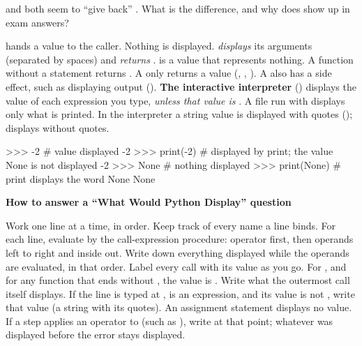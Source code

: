 \documentclass[10pt]{scrartcl}
\newenvironment{howto}[1]{\begin{mdframed}[style=howtostyle]{\color{NavyBlue}\textbf{#1}}\par\vspace{2pt}}{\end{mdframed}}
\begin{document}
\begin{qbox}
   and  both seem to ``give back'' . What is the difference, and why does  show up in exam answers?
\end{qbox}
\begin{itemize}
  \ii {} hands a value to the caller. Nothing is displayed.
  \ii {} \emph{displays} its arguments (separated by spaces) and \emph{returns} .
  \ii {} is a value that represents nothing. A function without a  statement returns .
  \ii A  only returns a value (, , ). A  also has a side effect, such as displaying output ().
  \ii \textbf{The interactive interpreter} (\cd{>{}>{}>}) displays the value of each expression you type, \emph{unless that value is }. A file run with  displays only what is printed.
  \ii In the interpreter a string value is displayed with quotes ();  displays  without quotes.
\end{itemize}
\begin{py}
>>> -2            # value displayed
-2
>>> print(-2)     # displayed by print; the value None is not displayed
-2
>>> None          # nothing displayed
>>> print(None)   # print displays the word None
None
\end{py}

\begin{howto}{How to answer a ``What Would Python Display'' question}
\begin{steps}
  \ii Work one line at a time, in order. Keep track of every name a line binds.
  \ii For each line, evaluate by the call-expression procedure: operator first, then operands left to right and inside out. Write down everything displayed while the operands are evaluated, in that order.
  \ii Label every call with its value as you go. For , and for any function that ends without , the value is .
  \ii Write what the outermost call itself displays.
  \ii If the line is typed at \cd{>{}>{}>}, is an expression, and its value is not , write that value (a string with its quotes). An assignment statement displays no value.
  \ii If a step applies an operator to  (such as ), write  at that point; whatever was displayed before the error stays displayed.
\end{steps}
\end{howto}
\end{document}
